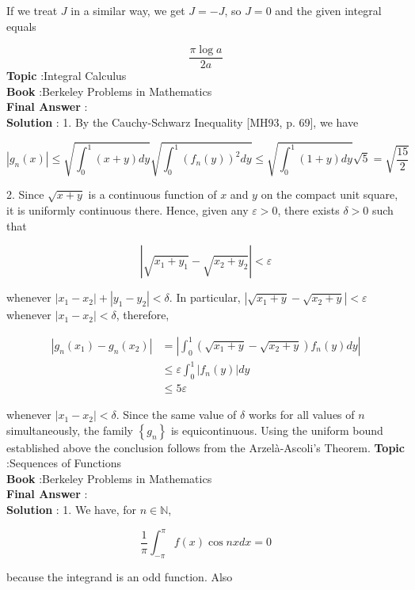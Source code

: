 \documentclass[10pt]{article}
\begin{document}
If we treat $J$ in a similar way, we get $J=-J$, so $J=0$ and the given integral equals

$$
\frac{\pi \log a}{2 a}
$$
\textbf{Topic} :Integral Calculus \\
\textbf{Book} :Berkeley Problems in Mathematics\\
\textbf{Final Answer} :\\


\textbf{Solution} : 1. By the Cauchy-Schwarz Inequality [MH93, p. 69], we have

$$
\left|g_{n}(x)\right| \leqslant \sqrt{\int_{0}^{1}(x+y) d y} \sqrt{\int_{0}^{1}\left(f_{n}(y)\right)^{2} d y} \leqslant \sqrt{\int_{0}^{1}(1+y) d y} \sqrt{5}=\sqrt{\frac{15}{2}}
$$

2. Since $\sqrt{x+y}$ is a continuous function of $x$ and $y$ on the compact unit square, it is uniformly continuous there. Hence, given any $\varepsilon>0$, there exists $\delta>0$ such that

$$
\left|\sqrt{x_{1}+y_{1}}-\sqrt{x_{2}+y_{2}}\right|<\varepsilon
$$

whenever $\left|x_{1}-x_{2}\right|+\left|y_{1}-y_{2}\right|<\delta$. In particular, $\left|\sqrt{x_{1}+y}-\sqrt{x_{2}+y}\right|<\varepsilon$ whenever $\left|x_{1}-x_{2}\right|<\delta$, therefore,

$$
\begin{aligned}
\left|g_{n}\left(x_{1}\right)-g_{n}\left(x_{2}\right)\right| &=\left|\int_{0}^{1}\left(\sqrt{x_{1}+y}-\sqrt{x_{2}+y}\right) f_{n}(y) d y\right| \\
& \leqslant \varepsilon \int_{0}^{1}\left|f_{n}(y)\right| d y \\
& \leqslant 5 \varepsilon
\end{aligned}
$$

whenever $\left|x_{1}-x_{2}\right|<\delta$. Since the same value of $\delta$ works for all values of $n$ simultaneously, the family $\left\{g_{n}\right\}$ is equicontinuous. Using the uniform bound established above the conclusion follows from the Arzelà-Ascoli's Theorem.
\textbf{Topic} :Sequences of Functions \\
\textbf{Book} :Berkeley Problems in Mathematics\\
\textbf{Final Answer} :\\


\textbf{Solution} : 1. We have, for $n \in \mathbb{N}$,

$$
\frac{1}{\pi} \int_{-\pi}^{\pi} f(x) \cos n x d x=0
$$

because the integrand is an odd function. Also
\end{document}
